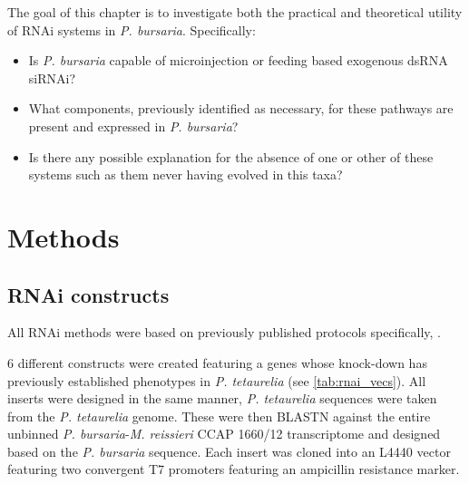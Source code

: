 The goal of this chapter is to investigate both the practical and
theoretical utility of RNAi systems in \textit{P. bursaria}. 
Specifically:
\begin{itemize}
    \item Is \textit{P. bursaria} capable of microinjection or feeding based
        exogenous dsRNA siRNAi?
    \item What components, previously identified as necessary, for these pathways
        are present and expressed in \textit{P. bursaria}? 
    \item Is there any possible explanation for the absence of one or other
        of these systems such as them never having evolved in this taxa?
\end{itemize}


\section{Methods}

\subsection{RNAi constructs}

All RNAi methods were based on previously published protocols specifically,
\citep{Galvani2001,Galvani2002,Beisson2010}.

6 different constructs were created featuring a genes whose knock-down
has previously established phenotypes in \textit{P. tetaurelia} (see \cref{tab:rnai_vecs}).
All inserts were designed in the same manner, \textit{P. tetaurelia} sequences
were taken from the \textit{P. tetaurelia} genome. 
These were then BLASTN against the entire unbinned \textit{P. bursaria}-\textit{M. reissieri}
CCAP 1660/12 transcriptome and designed based on the \textit{P. bursaria} sequence.
Each insert was cloned into an L4440 vector featuring two convergent T7 promoters
featuring an ampicillin resistance marker. 

